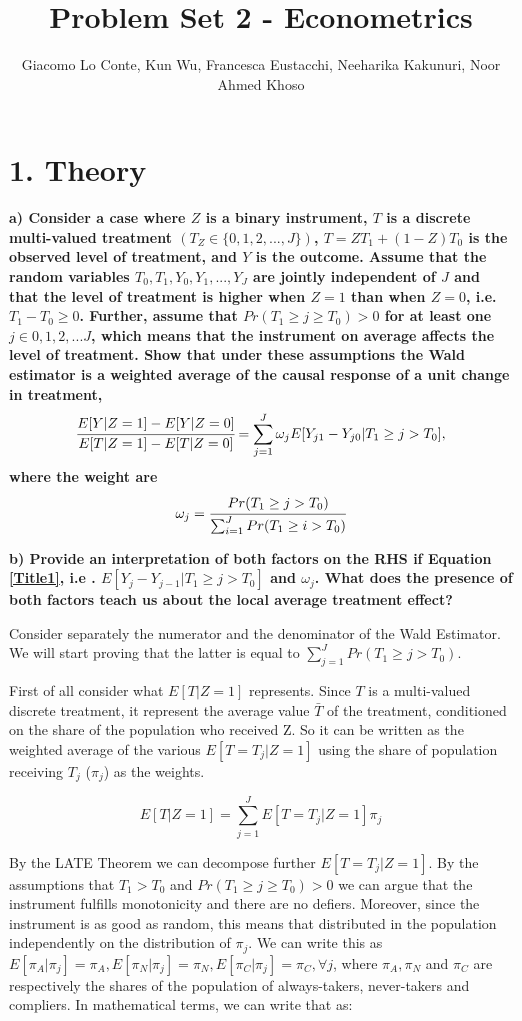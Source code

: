 \documentclass[a4paper,12pt,oneside,English]{article}
\title{Problem Set 2 - Econometrics}
\author{ Giacomo Lo Conte, Kun Wu, Francesca Eustacchi, Neeharika Kakunuri, Noor Ahmed Khoso }
\begin{document}
\maketitle
\section{1. Theory}
\textbf{a) Consider a case where $Z$ is a binary instrument, $T$ is a discrete multi-valued treatment $(T_Z \in \{0,1,2,...,J\})$, $T = Z T_1 + (1 - Z)T_0$ is the observed level of treatment, and $Y$ is the outcome. Assume that the random variables $T_0, T_1, Y_0, Y_1, . . . , Y_J$ are jointly independent of $J$ and that the level of treatment is higher when $Z = 1$ than when $Z = 0$, i.e. $T_1 - T_0 \geq 0$. Further, assume that $Pr(T_1 \geq j \geq T_0) > 0$ for at least one $j \in {0,1,2,...J}$, which means that the instrument on average affects the level of treatment. Show that under these assumptions the Wald estimator is a weighted average of the causal response of a unit change in treatment,}
\begin{equation}
\label{Title1}
    \cfrac{E[Y| Z = 1] - E[Y | Z = 0]}{E[T| Z = 1] - E[T| Z = 0]} = \sum^J_{j=1} \omega_j  E[Y_{j1} - Y_{j0}|T_1 \geq j > T_0],
\end{equation}
\textbf{where the weight are }
\begin{equation}
\label{Title2}
\omega_j = \cfrac{Pr(T_1\geq j > T_0)}{\sum^J_{i=1}Pr(T_1\geq i > T_0)}
\end{equation}


\textbf{b) Provide an interpretation of both factors on the RHS if Equation \eqref{Title1}, i.e . $E [Y_j - Y_{j−1}| T_1 \geq j > T_0]$
and $\omega_j$. What does the presence of both factors teach us about the local average treatment effect?}

Consider separately the numerator and the denominator of the Wald Estimator. We will start proving that the latter is equal to $\sum_{j=1}^J Pr(T_1\geq j>T_0)$.

First of all consider what $E[T|Z=1]$ represents. Since $T$ is a multi-valued discrete treatment, it represent the average value $\bar T$ of the treatment, conditioned on the share of the population who received Z. So it can be written as the weighted average of the various $E[T=T_j|Z=1]$ using the share of population receiving $T_j$ ($\pi_j$) as the weights.

\[
E[T|Z=1]=\sum_{j=1}^J E[T=T_j|Z=1] \pi_j
\]

By the LATE Theorem we can decompose further $E[T=T_j|Z=1]$. By the assumptions that $T_1>T_0$ and $Pr(T_1 \geq j \geq T_0) > 0$ we can argue that the instrument fulfills monotonicity and there are no defiers. Moreover, since the instrument is as good as random, this means that distributed in the population independently on the distribution of $\pi_j$. We can write this as $E[\pi_A|\pi_j]=\pi_A,E[\pi_N|\pi_j]=\pi_N,E[\pi_C|\pi_j]=\pi_C,\forall j$, where $\pi_A, \pi_N$ and $\pi_C$ are respectively the shares of the population of always-takers, never-takers and compliers. In mathematical terms, we can write that as:
\end{document}
